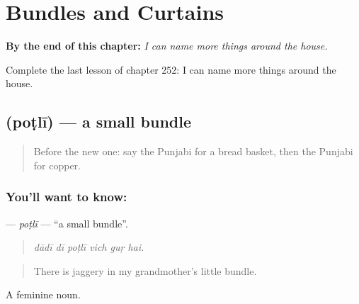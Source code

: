 
\chapter{Bundles and Curtains}
\label{ch:pa-a2-bundles-and-curtains}

\begin{chapteropening}
\textbf{By the end of this chapter:} \emph{I can name more things around the house.}

Complete the last lesson of chapter 252: I can name more things around the house.
\end{chapteropening}

\section[\texorpdfstring{\pa{ਪੋਟਲੀ} (poṭlī)}{ਪੋਟਲੀ (poṭlī)}]{ (poṭlī) — a small bundle}

\label{lesson:PA-C252-potli}



\begin{quote}
Before the new one: say the Punjabi for a bread basket, then the Punjabi for copper.
\end{quote}

\subsection*{You'll want to know: }
\textbf{} — \emph{poṭlī} — \textquotedblleft{}a small bundle\textquotedblright{}.

\begin{quote}
     
\end{quote}

\begin{quote}
\emph{dādī dī poṭlī vich guṛ hai.}
\end{quote}

\begin{quote}
There is jaggery in my grandmother's little bundle.
\end{quote}

A feminine noun.

